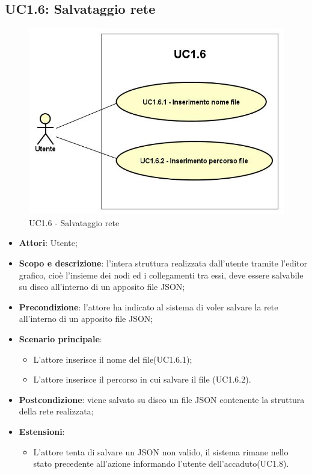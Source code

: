 \subsection{UC1.6: Salvataggio rete} 
\hypertarget{UC1.6}{}
\begin{figure} [H]
	\centering
	\includegraphics[scale=0.5]{Img/UC1-6} 
	\caption{UC1.6 - Salvataggio rete} \label{} 
\end{figure}  
\begin{itemize} 
	\item{\textbf{Attori}: Utente;} 
	\item{\textbf{Scopo e descrizione}: l'intera struttura realizzata dall'utente tramite l'editor grafico, cioè l'insieme dei nodi ed i collegamenti tra essi, deve essere salvabile su disco all'interno di un apposito file JSON;} 
	\item{ \textbf{Precondizione}: l'attore ha indicato al sistema di voler salvare la rete all'interno di un apposito file JSON;}
	\item{\textbf{Scenario principale}: } 
	\begin{itemize} 
		\item{L'attore inserisce il nome del file(UC1.6.1);} 
		\item{L'attore inserisce il percorso in cui salvare il file (UC1.6.2).} 
	\end{itemize} 
	\item{\textbf{Postcondizione}: viene salvato su disco un file JSON contenente la struttura della rete realizzata;}
	\item \textbf{Estensioni}:
	\begin{itemize}
		\item L'attore tenta di salvare un JSON non valido, il sistema rimane nello stato precedente all'azione informando l'utente dell'accaduto(UC1.8).
	\end{itemize} 
\end{itemize} 
